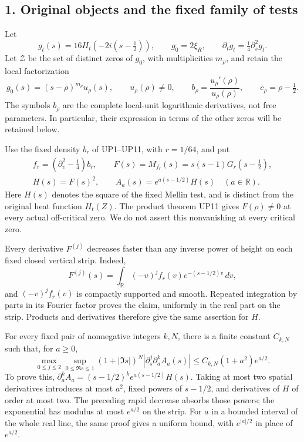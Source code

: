 \documentclass[
  10pt,
  a4paper,
]{article}
\begin{document}
\subsection{1. Original objects and the fixed family of
tests}\label{original-objects-and-the-fixed-family-of-tests}

Let \[
g_t(s)=16H_t(-2i(s-\tfrac12)),\qquad g_0=2\xi_R,\qquad
\partial_tg_t=\tfrac14\partial_s^2g_t.
\tag{GC1}
\] Let \(\mathcal Z\) be the set of distinct zeros of \(g_0\), with
multiplicities \(m_\rho\), and retain the local factorization \[
g_0(s)=(s-\rho)^{m_\rho}u_\rho(s),\qquad
u_\rho(\rho)\ne0,\qquad
b_\rho=\frac{u_\rho'(\rho)}{u_\rho(\rho)},\qquad
c_\rho=\rho-\tfrac12.
\tag{GC2}
\] The symbols \(b_\rho\) are the complete local-unit logarithmic
derivatives, not free parameters. In particular, their expression in
terms of the other zeros will be retained below.

Use the fixed density \(b_r\) of UP1--UP11, with \(r=1/64\), and put \[
\begin{gathered}
f_r=(\partial_v^2-\tfrac14)b_r,\qquad
F(s)=M_{f_r}(s)=s(s-1)G_r(s-\tfrac12),\\
H(s)=F(s)^2,\qquad A_a(s)=e^{a(s-1/2)}H(s)
\quad(a\in\mathbb R).
\end{gathered}
\tag{GC3}
\] Here \(H(s)\) denotes the square of the fixed Mellin test, and is
distinct from the original heat function \(H_t(Z)\). The product theorem
UP11 gives \(F(\rho)\ne0\) at every actual off-critical zero. We do not
assert this nonvanishing at every critical zero.

Every derivative \(F^{(j)}\) decreases faster than any inverse power of
height on each fixed closed vertical strip. Indeed, \[
F^{(j)}(s)=\int_{\mathbb R}(-v)^jf_r(v)e^{-(s-1/2)v}\,dv,
\] and \((-v)^jf_r(v)\) is compactly supported and smooth. Repeated
integration by parts in its Fourier factor proves the claim, uniformly
in the real part on the strip. Products and derivatives therefore give
the same assertion for \(H\).

For every fixed pair of nonnegative integers \(k,N\), there is a finite
constant \(C_{k,N}\) such that, for \(a\ge0\), \[
\max_{0\le j\le2}\sup_{0\le\Re s\le1}
(1+|\Im s|)^N
\left|\partial_s^j\partial_a^k A_a(s)\right|
\le C_{k,N}(1+a^2)e^{a/2}.
\tag{GC4}
\] To prove this, \(\partial_a^kA_a=(s-1/2)^ke^{a(s-1/2)}H(s)\). Taking
at most two spatial derivatives introduces at most \(a^2\), fixed powers
of \(s-1/2\), and derivatives of \(H\) of order at most two. The
preceding rapid decrease absorbs those powers; the exponential has
modulus at most \(e^{a/2}\) on the strip. For \(a\) in a bounded
interval of the whole real line, the same proof gives a uniform bound,
with \(e^{|a|/2}\) in place of \(e^{a/2}\).
\end{document}
